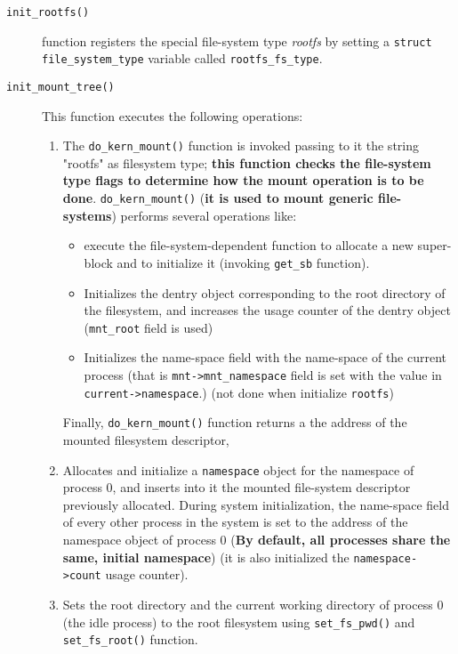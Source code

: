 \documentclass[10pt,a4paper]{article}
\begin{document}
\begin{description}
\item[\texttt{init\_rootfs()}] function registers the special file-system type \textit{rootfs} by setting a \texttt{struct file\_system\_type} variable called \texttt{rootfs\_fs\_type}.
\item[\texttt{init\_mount\_tree()}] This function executes the following operations:

\begin{enumerate}

\item The \texttt{do\_kern\_mount()} function is invoked passing to it the string "rootfs" as filesystem type; \textbf{this function checks the file-system type flags to determine how the mount operation is to be done}. \texttt{do\_kern\_mount()} (\textbf{it is used to mount generic file-systems}) performs several operations like:
\begin{itemize}
\item execute the file-system-dependent function to allocate a new super-block and to initialize it (invoking \texttt{get\_sb} function).
\item Initializes the dentry object corresponding to the root directory of the filesystem, and increases the usage counter of the dentry object (\texttt{mnt\_root} field is used)
\item Initializes the name-space field with the name-space of the current process (that is \texttt{mnt->mnt\_namespace} field is set with the value in \texttt{current->namespace}.) (not done when initialize \texttt{rootfs})
\end{itemize}

Finally, \texttt{do\_kern\_mount()} function returns a the address of the mounted filesystem descriptor, 

\item Allocates and initialize a \texttt{namespace} object for the namespace of process 0, and inserts into it the mounted file-system descriptor previously allocated. During system initialization, the name-space field of every other process in the system is set to the address of the namespace object of process 0 (\textbf{By default, all processes share the same, initial namespace}) (it is also initialized the \texttt{namespace->count} usage counter).

\item Sets the root directory and the current working directory of process $0$ (the idle process) to the root filesystem using \texttt{set\_fs\_pwd()} and \texttt{set\_fs\_root()} function.

\end{enumerate}
\end{description}
\end{document}

